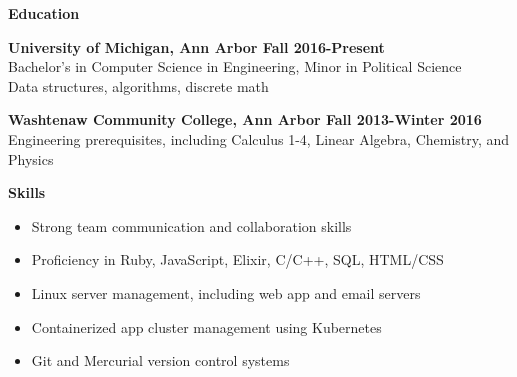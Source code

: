 \documentclass[10pt,letter]{article}
\begin{document}
\vspace{0.15in}
{\Large\textbf{Education}}
\vspace{0.15in}

\textbf{University of Michigan, Ann Arbor \hfill  Fall 2016-Present} \\
Bachelor's in Computer Science in Engineering, Minor in Political Science \\
Data structures, algorithms, discrete math

\vspace{0.25in}

\textbf{Washtenaw Community College, Ann Arbor \hfill  Fall 2013-Winter 2016} \\
Engineering prerequisites, including Calculus 1-4, Linear Algebra, Chemistry, and Physics

\vspace{0.25in}

\vspace{0.15in}
{\Large\textbf{Skills}}

\begin{itemize}
  \item{Strong team communication and collaboration skills}
  \item{Proficiency in Ruby, JavaScript, Elixir, C/C++, SQL, HTML/CSS}
  \item{Linux server management, including web app and email servers}
  \item{Containerized app cluster management using Kubernetes}
  \item{Git and Mercurial version control systems}
\end{itemize}
\end{document}

